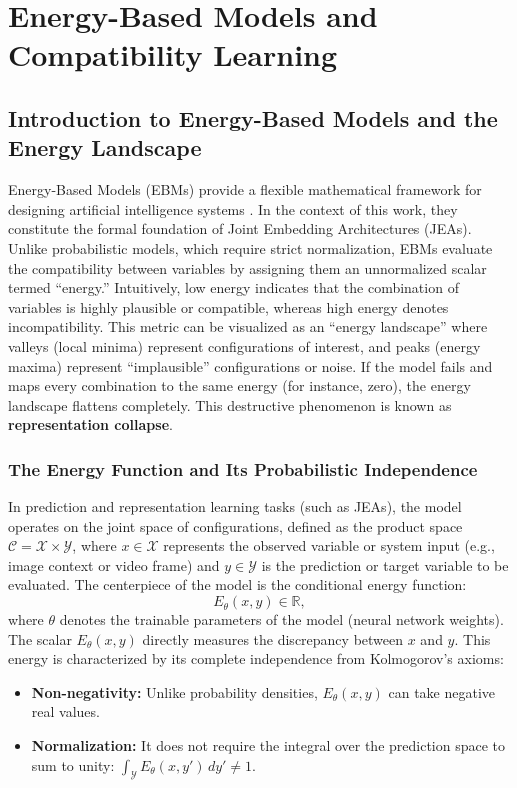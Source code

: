 \documentclass[11pt, oneside, openany]{book}
\begin{document}
\chapter{Energy-Based Models and Compatibility Learning}
\label{chap:2}

\section{Introduction to Energy-Based Models and the Energy Landscape}
\label{sec:2.1}

Energy-Based Models (EBMs) provide a flexible mathematical framework for designing artificial intelligence systems \cite{lecun2006tutorial}. In the context of this work, they constitute the formal foundation of Joint Embedding Architectures (JEAs). Unlike probabilistic models, which require strict normalization, EBMs evaluate the compatibility between variables by assigning them an unnormalized scalar termed ``energy.'' Intuitively, low energy indicates that the combination of variables is highly plausible or compatible, whereas high energy denotes incompatibility. This metric can be visualized as an ``energy landscape'' where valleys (local minima) represent configurations of interest, and peaks (energy maxima) represent ``implausible'' configurations or noise. If the model fails and maps every combination to the same energy (for instance, zero), the energy landscape flattens completely. This destructive phenomenon is known as \textbf{representation collapse}.

\subsection{The Energy Function and Its Probabilistic Independence}
\label{sec:2.1.1}

In prediction and representation learning tasks (such as JEAs), the model operates on the joint space of configurations, defined as the product space $\mathcal{C} = \mathcal{X} \times \mathcal{Y}$, where $x \in \mathcal{X}$ represents the observed variable or system input (e.g., image context or video frame) and $y \in \mathcal{Y}$ is the prediction or target variable to be evaluated. The centerpiece of the model is the conditional energy function:
\begin{equation}
\label{eq:2.1}
E_{\theta}(x,y) \in \mathbb{R},
\end{equation}
where $\theta$ denotes the trainable parameters of the model (neural network weights). The scalar $E_{\theta}(x,y)$ directly measures the discrepancy between $x$ and $y$. This energy is characterized by its complete independence from Kolmogorov's axioms:
\begin{itemize}
    \item \textbf{Non-negativity:} Unlike probability densities, $E_{\theta}(x,y)$ can take negative real values.
    \item \textbf{Normalization:} It does not require the integral over the prediction space to sum to unity: $\int_{\mathcal{Y}} E_{\theta}(x,y')\,dy' \neq 1$.
\end{itemize}
\end{document}

